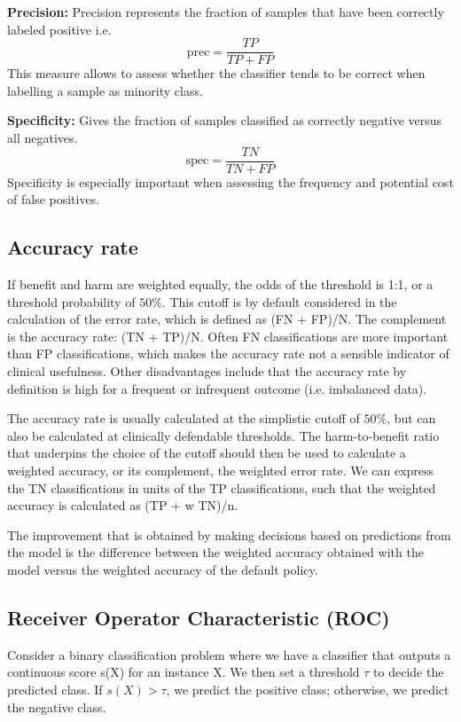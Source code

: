 \textbf{Precision:}
Precision represents the fraction of samples that have been correctly labeled positive i.e.
\[
	\text{prec} = \frac{TP}{TP + FP}
\]
This measure allows to assess whether the classifier tends to be correct when labelling a sample as minority class.

\textbf{Specificity:}
Gives the fraction of samples classified as correctly negative versus all negatives.
\[
	\text{spec} = \frac{TN}{TN + FP}
\]
Specificity is especially important when assessing the frequency and potential cost of false positives.

\subsection{Accuracy rate}

	If benefit and harm are weighted equally, the odds of the threshold is 1:1, or a threshold probability of $50\%$. 
	This cutoff is by default considered in the calculation of the error rate, which is defined as (FN + FP)/N. 
	The complement is the accuracy rate: (TN + TP)/N.
	Often FN classifications are more important than FP classifications, which makes the accuracy rate not a sensible indicator of clinical usefulness.
	Other disadvantages include that the accuracy rate by definition is high for a frequent or infrequent outcome (i.e. imbalanced data).
	
	The accuracy rate is usually calculated at the simplistic cutoff of $50\%$, but can also be calculated at clinically defendable thresholds. 
	The harm-to-benefit ratio that underpins the choice of the cutoff should then be used to calculate a weighted accuracy, or its complement, the weighted error rate.
	We can express the TN classifications in units of the TP classifications, such that the weighted accuracy is calculated as (TP + w TN)/n.
	
	The improvement that is obtained by making decisions based on predictions from the model is the difference between the weighted accuracy
	obtained with the model versus the weighted accuracy of the default policy.
	



\subsection{Receiver Operator Characteristic (ROC)}
	Consider a binary classification problem where we have a classifier that outputs a continuous score s(X) for an instance X.
	We then set a threshold $\tau$ to decide the predicted class. If $s(X) > \tau$, we predict the positive class; otherwise, we predict the negative class.
	

